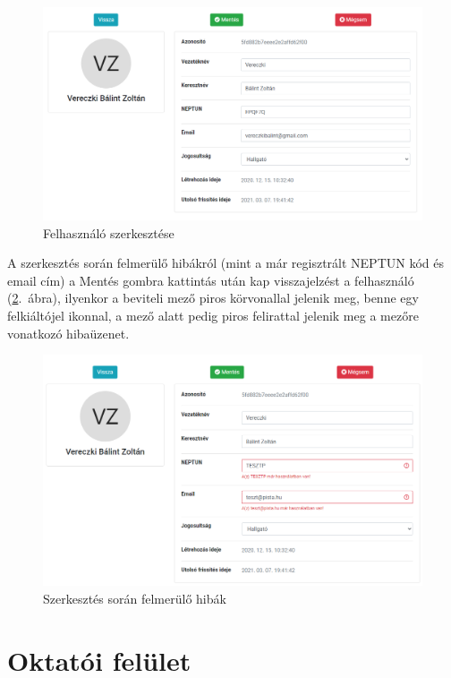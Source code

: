 \documentclass[
]{thesis-ekf}
\theoremstyle{definition}
\theoremstyle{remark}
\begin{document}
	\begin{figure}[!ht]
		\centering
		\includegraphics[width=12cm]{kepek/screenshots/ugyintezo_felhasznalo_szerkesztes.png}
		\caption{Felhasználó szerkesztése}
		\label{fig:ugyint_felhasznalo_szerkesztes}
	\end{figure}
	
	A szerkesztés során felmerülő hibákról (mint a már regisztrált NEPTUN kód és email cím) a Mentés gombra kattintás után kap visszajelzést a felhasználó (\ref{fig:ugyint_felhasznalo_szerkesztes_hiba}.~ábra), ilyenkor a beviteli mező piros körvonallal jelenik meg, benne egy felkiáltójel ikonnal, a mező alatt pedig piros felirattal jelenik meg a mezőre vonatkozó hibaüzenet.
	
	\begin{figure}[!ht]
		\centering
		\includegraphics[width=12cm]{kepek/screenshots/ugyintezo_felhasznalo_szerkesztes_hiba.png}
		\caption{Szerkesztés során felmerülő hibák}
		\label{fig:ugyint_felhasznalo_szerkesztes_hiba}
	\end{figure}
	
	\section{Oktatói felület}
\end{document}

